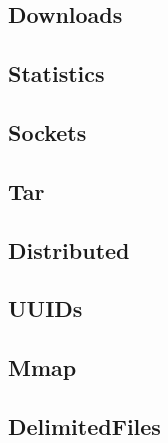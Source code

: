 \hypertarget{14923009348945346248}{}


\subsection{Downloads}



\hypertarget{9437621938979276328}{}


\subsection{Statistics}



\hypertarget{3574674985174674746}{}


\subsection{Sockets}



\hypertarget{15486086682420278394}{}


\subsection{Tar}



\hypertarget{13830325491332105953}{}


\subsection{Distributed}



\hypertarget{2767829618755343548}{}


\subsection{UUIDs}



\hypertarget{8234966906176515355}{}


\subsection{Mmap}



\hypertarget{10456404236587911968}{}


\subsection{DelimitedFiles}



